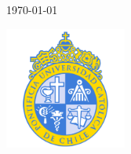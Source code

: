 \documentclass[letterpaper]{article}
\begin{document}
\begin{titlepage}


    \vfill\vfill\vfill %

    {\large\today} %


    \vfill\vfill
    \includegraphics[width=0.3\textwidth]{img/logo.png}\\[1cm] %


    \vfill %

\end{titlepage}


\end{document}
